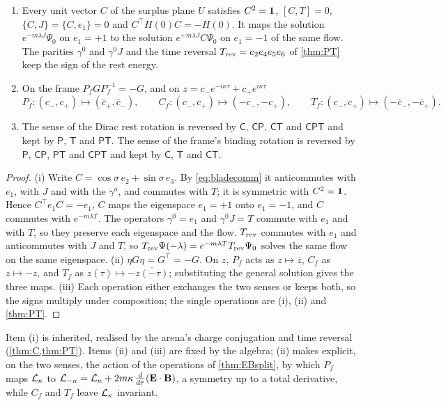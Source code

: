 \begin{proposition}
\label{mb:senses}
\begin{enumerate}[label=(\roman*),leftmargin=2.2em]
\item Every unit vector $C$ of the surplus plane $U$ satisfies $C^2=\mathbf 1$, $[C,T]=0$, $\{C,J\}=\{C,e_1\}=0$ and $C^{\!\top}H(0)C=-H(0)$. It maps the
solution $e^{-m\lambda J}\Psi_0$ on $e_1=+1$ to the solution $e^{+m\lambda J}C\Psi_0$ on $e_1=-1$ of the same flow. The parities $\gamma^0$ and
$\gamma^0J$ and the time reversal $T_{\rm rev}=e_2e_4e_5e_6$ of \cref{thm:PT} keep the sign of the rest energy.
\item On the frame $P_fGP_f^{-1}=-G$, and on $z=c_-e^{-i\kappa\tau}+c_+e^{i\kappa\tau}$
\[
P_f\colon(c_-,c_+)\mapsto(\bar c_+,\bar c_-),\qquad C_f\colon(c_-,c_+)\mapsto(-c_-,-c_+),\qquad T_f\colon(c_-,c_+)\mapsto(-\bar c_-,-\bar c_+).
\]
\item The sense of the Dirac rest rotation is reversed by $\mathsf C$, $\mathsf{CP}$, $\mathsf{CT}$ and $\mathsf{CPT}$ and kept by $\mathsf P$,
$\mathsf T$ and $\mathsf{PT}$. The sense of the frame's binding rotation is reversed by $\mathsf P$, $\mathsf{CP}$, $\mathsf{PT}$ and $\mathsf{CPT}$
and kept by $\mathsf C$, $\mathsf T$ and $\mathsf{CT}$.
\end{enumerate}
\end{proposition}

\begin{proof}
(i) Write $C=\cos\sigma\,e_2+\sin\sigma\,e_3$. By \eqref{eq:bladecomm} it anticommutes with $e_1$, with $J$ and with the $\gamma^a$, and
commutes with $T$; it is symmetric with $C^2=\mathbf 1$. Hence $C^{\!\top}e_1C=-e_1$, $C$ maps the eigenspace $e_1=+1$ onto $e_1=-1$, and $C$ commutes
with $e^{-m\lambda T}$. The operators $\gamma^0=e_1$ and $\gamma^0J=T$ commute with $e_1$ and with $T$, so they preserve each eigenspace and the
flow. $T_{\rm rev}$ commutes with $e_1$ and anticommutes with $J$ and $T$, so $T_{\rm rev}\Psi(-\lambda)=e^{-m\lambda T}T_{\rm rev}\Psi_0$ solves the
same flow on the same eigenspace. (ii) $\eta G\eta=G^{\!\top}=-G$. On $z$, $P_f$ acts as $z\mapsto\bar z$, $C_f$ as $z\mapsto-z$, and $T_f$ as
$z(\tau)\mapsto-\overline{z(-\tau)}$; substituting the general solution gives the three maps. (iii) Each operation either exchanges the two
senses or keeps both, so the signs multiply under composition; the single operations are (i), (ii) and \cref{thm:PT}.
\end{proof}

Item (i) is inherited, realised by the arena's charge conjugation and time reversal (\cref{thm:C,thm:PT}). Items (ii) and (iii) are
fixed by the algebra; (ii) makes explicit, on the two senses, the action of the operations of \cref{thm:EBsplit}, by which $P_f$ maps
$\mathcal L_\kappa$ to $\mathcal L_{-\kappa}=\mathcal L_\kappa+2m\kappa\,\tfrac{d}{d\tau}(\mathbf E\cdot\mathbf B)$, a symmetry up to a total derivative, while $C_f$ and $T_f$ leave $\mathcal L_\kappa$ invariant.

